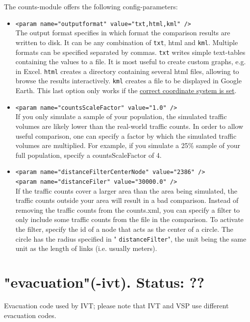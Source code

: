 The counts-module offers the following config-parameters:
\begin{itemize}
	\item 
\texttt{<param name="outputformat" value="txt,html,kml" />}
\\     The output format specifies in which format the comparison results are written to disk. It can be any combination of 
\texttt{txt}, html and 
\texttt{kml}. Multiple formats can be specified separated by commas. 
\texttt{txt} writes simple text-tables containing the values to a file. It is most useful to create custom graphs, e.g. in Excel. 
\texttt{html} creates a directory containing several html files, allowing to browse the results interactively. 
\texttt{kml} creates a file to be displayed in Google Earth. This last option only works if the \href{http://www.matsim.org/node/405}{correct coordinate system is set}.
	\item 
\texttt{<param name="countsScaleFactor" value="1.0" />}
\\     If you only simulate a sample of your population, the simulated  traffic volumes are likely lower than the real-world traffic counts. In  order to allow useful comparison, one can specify a factor by which the  simulated traffic volumes are multiplied. For example, if you simulate a  25\% sample of your full population, specify a countsScaleFactor  of 4.
	\item 
\texttt{<param name="distanceFilterCenterNode" value="2386" />
\\     <param name="distanceFiler" value="30000.0" />}
\\     If the traffic counts cover a larger area than the area being  simulated, the traffic counts outside your area will result in a bad  comparison. Instead of removing the traffic counts from the counts.xml,  you can specify a filter to only include some traffic counts from the  file in the comparison. To activate the filter, specify the id of a node  that acts as the center of a circle. The circle has the radius  specified in "
\texttt{distanceFilter}", the unit being the same unit as the length of links (i.e. usually meters).
\end{itemize}



\vfill\eject
\section{"evacuation"(-ivt). Status: ??}

Evacuation code used by IVT; please note that IVT and VSP use different evacuation codes.

